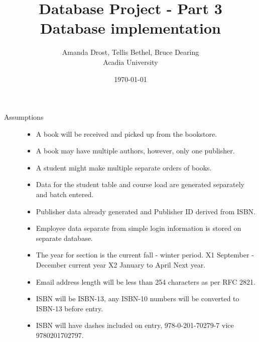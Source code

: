 \documentclass{article}
\begin{document}
\title{Database Project - Part 3 Database implementation}
    \author{Amanda Drost, Tellis Bethel, Bruce Dearing\\
    Acadia University}
\date{\today}
\maketitle
\clearpage

\begin{description}

    \item[Assumptions] \hfill 
        \begin{itemize}
            \item A book will be received and picked up from the bookstore.
            \item A book may have multiple authors, however, only one publisher.
            \item A student might make multiple separate orders of books.
            \item Data for the student table and course load are generated separately
                 and batch entered.
            \item Publisher data already generated and Publisher ID derived from ISBN.
            \item Employee data separate from simple login information is stored on 
                  separate database.
            \item The year for section is the current fall - winter period. X1 September - December current year X2 January to April Next year.
            \item Email address length will be less than 254 characters as per RFC 2821.
            \item ISBN will be ISBN-13, any ISBN-10 numbers will be converted to ISBN-13 before entry.
            \item ISBN will have dashes included on entry, 978-0-201-70279-7 vice 9780201702797.
        \end{itemize}
\end{description}
\end{document}
